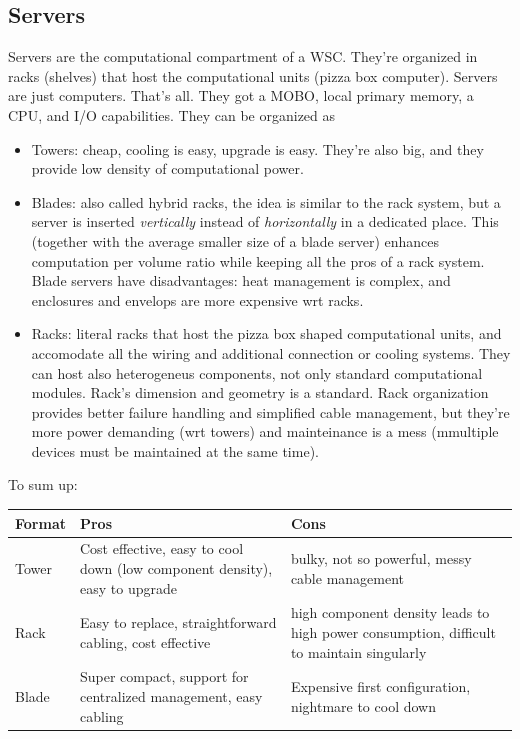 \documentclass[10pt,a4paper]{article}
\begin{document}
			\subsection{Servers}
				Servers are the computational compartment of a WSC. They're organized in racks (shelves) that host the computational units (pizza box computer). Servers are just computers. That's all. They got a MOBO, local primary memory, a CPU, and I/O capabilities. They can be organized as
				\begin{itemize}
					\item Towers: cheap, cooling is easy, upgrade is easy. They're also big, and they provide low density of computational power.
					\item Blades: also called hybrid racks, the idea is similar to the rack system, but a server is inserted \emph{vertically} instead of \emph{horizontally} in a dedicated place. This (together with the average smaller size of a blade server) enhances computation per volume ratio while keeping all the pros of a rack system. Blade servers have disadvantages: heat management is complex, and enclosures and envelops are more expensive wrt racks.
					\item Racks: literal racks that host the pizza box shaped computational units, and accomodate all the wiring and additional connection or cooling systems. They can host also heterogeneus components, not only standard computational modules. Rack's dimension and geometry is a standard. Rack organization provides better failure handling and simplified cable management, but they're more power demanding (wrt towers) and mainteinance is a mess (mmultiple devices must be maintained at the same time).
				\end{itemize}
				To sum up:
				\begin{center}
					\begin{tabular}{ | m{2cm} || m{5cm} | m{5cm} |}
					\hline
					\textbf{Format} & \textbf{Pros} & \textbf{Cons} \\
					\hline
					\hline
					Tower & Cost effective, easy to cool down (low component density), easy to upgrade & bulky, not so powerful, messy cable management \\
					\hline
					Rack & Easy to replace, straightforward cabling, cost effective & high component density leads to high power consumption, difficult to maintain singularly \\
					\hline
					Blade & Super compact, support for centralized management, easy cabling & Expensive first configuration, nightmare to cool down \\
					\hline
					\end{tabular}
				\end{center}
				
\end{document}

